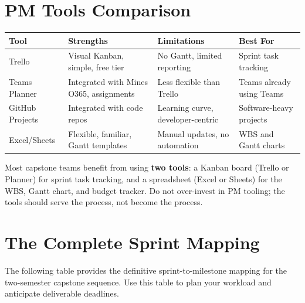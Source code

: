 \section{PM Tools Comparison}
\begin{center}\small
\begin{tabularx}{\textwidth}{l>{\raggedright\arraybackslash}X>{\raggedright\arraybackslash}X>{\raggedright\arraybackslash}X}
\toprule
\textbf{Tool} & \textbf{Strengths} & \textbf{Limitations} & \textbf{Best For} \\
\midrule
Trello & Visual Kanban, simple, free tier & No Gantt, limited reporting & Sprint task tracking \\
Teams Planner & Integrated with Mines O365, assignments & Less flexible than Trello & Teams already using Teams \\
GitHub Projects & Integrated with code repos & Learning curve, developer-centric & Software-heavy projects \\
Excel/Sheets & Flexible, familiar, Gantt templates & Manual updates, no automation & WBS and Gantt charts \\
\bottomrule
\end{tabularx}
\end{center}

Most capstone teams benefit from using \textbf{two tools}: a Kanban board (Trello or Planner) for sprint task tracking, and a spreadsheet (Excel or Sheets) for the WBS, Gantt chart, and budget tracker. Do not over-invest in PM tooling; the tools should serve the process, not become the process.


\section{The Complete Sprint Mapping}
The following table provides the definitive sprint-to-milestone mapping for the two-semester capstone sequence. Use this table to plan your workload and anticipate deliverable deadlines.

